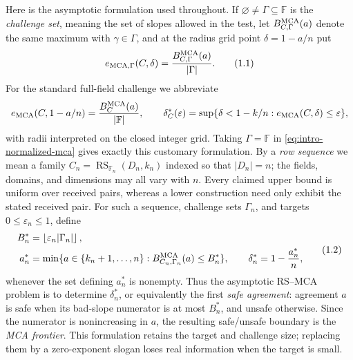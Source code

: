 \documentclass[12pt,a4paper]{amsart}
\numberwithin{equation}{section}
\theoremstyle{remark}
\DeclareMathOperator{\RS}{RS}
\newcommand{\F}{\mathbb F}
\newcommand{\eps}{\varepsilon}
\newcommand{\abs}[1]{\lvert #1\rvert}
\newcommand{\floor}[1]{\left\lfloor #1\right\rfloor}
\begin{document}
Here is the asymptotic formulation used throughout.  If
\(\varnothing\ne\Gamma\subseteq\F\) is the \emph{challenge set}, meaning
the set of slopes allowed in the test, let
\(B_{C,\Gamma}^{\rm MCA}(a)\) denote the same maximum with
\(\gamma\in\Gamma\), and at the radius grid point \(\delta=1-a/n\) put
\[
 e_{\rm MCA,\Gamma}(C,\delta)
   =\frac{B_{C,\Gamma}^{\rm MCA}(a)}{\abs\Gamma}.
 \tag{1.1}\label{eq:intro-normalized-mca}
\]
For the standard full-field challenge we abbreviate
\[
 e_{\rm MCA}(C,1-a/n)=\frac{B_C^{\rm MCA}(a)}{\abs\F},
 \qquad
 \delta_C^*(\eps)=\sup\{\delta<1-k/n:
                         e_{\rm MCA}(C,\delta)\le\eps\},
\]
with radii interpreted on the closed integer grid.  Taking
\(\Gamma=\F\) in \eqref{eq:intro-normalized-mca} gives exactly this
customary formulation.
By a \emph{row sequence} we mean a family
\(C_n=\RS_{\F_n}(D_n,k_n)\) indexed so that \(\abs{D_n}=n\); the fields,
domains, and dimensions may all vary with \(n\).  Every claimed upper
bound is uniform over received pairs, whereas a lower construction need
only exhibit the stated received pair.  For such a sequence,
challenge sets
\(\Gamma_n\), and targets \(0\le\eps_n\le1\), define
\[
 \begin{split}
 B_n^*&=\floor{\eps_n\abs{\Gamma_n}},\\
 a_n^*&=\min\{a\in\{k_n+1,\ldots,n\}:
              B_{C_n,\Gamma_n}^{\rm MCA}(a)\le B_n^*\},
 \qquad
 \delta_n^*=1-\frac{a_n^*}{n},
 \end{split}
 \tag{1.2}\label{eq:intro-asymptotic-threshold}
\]
whenever the set defining \(a_n^*\) is nonempty.  Thus the asymptotic
RS--MCA problem is to determine \(\delta_n^*\), or equivalently the first
\emph{safe agreement}: agreement \(a\) is safe when its bad-slope
numerator is at most \(B_n^*\), and unsafe otherwise.  Since the numerator
is nonincreasing in \(a\), the resulting safe/unsafe boundary is the
\emph{MCA frontier}.  This formulation retains the target and challenge
size; replacing them by a zero-exponent slogan loses real information when
the target is small.
\end{document}
